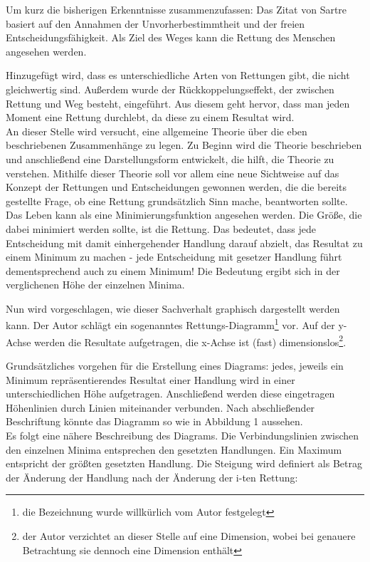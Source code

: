 \documentclass[12pt,a4paper,oneside]{article}
\begin{document}
  Um kurz die bisherigen Erkenntnisse zusammenzufassen: Das Zitat von Sartre basiert auf den Annahmen der Unvorherbestimmtheit und der freien Entscheidungsfähigkeit. Als Ziel des Weges kann die Rettung des Menschen angesehen werden. 
  
  Hinzugefügt wird, dass es unterschiedliche Arten von Rettungen gibt, die nicht gleichwertig sind. Außerdem wurde der Rückkoppelungseffekt, der zwischen Rettung und Weg besteht, eingeführt. Aus diesem geht hervor, dass man jeden Moment eine Rettung durchlebt, da diese zu einem Resultat wird. \\
  
  An dieser Stelle wird versucht, eine allgemeine Theorie über die eben beschriebenen Zusammenhänge zu legen. Zu Beginn wird die Theorie beschrieben und anschließend eine Darstellungsform entwickelt, die hilft, die Theorie zu verstehen. Mithilfe dieser Theorie soll vor allem eine neue Sichtweise auf das Konzept der Rettungen und Entscheidungen gewonnen werden, die die bereits gestellte Frage, ob eine Rettung grundsätzlich Sinn mache, beantworten sollte. \\
  
  Das Leben kann als eine Minimierungsfunktion angesehen werden. Die Größe, die dabei minimiert werden sollte, ist die Rettung. Das bedeutet, dass jede Entscheidung mit damit einhergehender Handlung darauf abzielt, das Resultat zu einem Minimum zu machen - jede Entscheidung mit gesetzer Handlung führt dementsprechend auch zu einem Minimum! Die Bedeutung ergibt sich in der verglichenen Höhe der einzelnen Minima. 
  
  Nun wird vorgeschlagen, wie dieser Sachverhalt graphisch dargestellt werden kann. Der Autor schlägt ein sogenanntes Rettungs-Diagramm\footnote{die Bezeichnung wurde willkürlich vom Autor festgelegt} vor. Auf der y-Achse werden die Resultate aufgetragen, die x-Achse ist (fast) dimensionslos\footnote{der Autor verzichtet an dieser Stelle auf eine Dimension, wobei bei genauere Betrachtung sie dennoch eine Dimension enthält}.
  
  Grundsätzliches vorgehen für die Erstellung eines Diagrams: jedes, jeweils ein Minimum repräsentierendes Resultat einer Handlung wird in einer unterschiedlichen Höhe aufgetragen. Anschließend werden diese eingetragen Höhenlinien durch Linien miteinander verbunden. Nach abschließender Beschriftung könnte das Diagramm so wie in Abbildung 1 aussehen. \\
  
  Es folgt eine nähere Beschreibung des Diagrams. Die Verbindungslinien zwischen den einzelnen Minima entsprechen den gesetzten Handlungen. Ein Maximum entspricht der größten gesetzten Handlung. Die Steigung wird definiert als Betrag der Änderung der Handlung nach der Änderung der i-ten Rettung:
  
\end{document}
